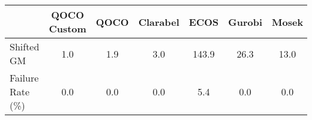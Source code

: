 \begin{tabular}{lcccccc}
  \hline
    & \textbf{QOCO Custom}   & \textbf{QOCO} & \textbf{Clarabel} & \textbf{ECOS} & \textbf{Gurobi} & \textbf{Mosek} \\ \hline
  Shifted GM & 1.0 & 1.9 & 3.0 & 143.9 & 26.3 & 13.0 \\ 
  Failure Rate (\%) & 0.0 & 0.0 & 0.0 & 5.4 & 0.0 & 0.0 \\ \hline 
\end{tabular}
